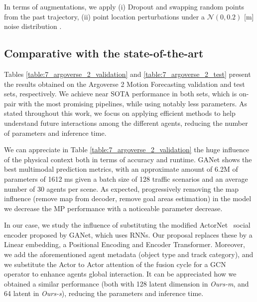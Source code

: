 In terms of augmentations, we apply (i) Dropout and swapping random points from the past trajectory, (ii) point location perturbations under a $\mathcal{N}(0, 0.2)$ [m] noise distribution \cite{ye2021tpcn}.

\subsection{Comparative with the state-of-the-art}
\label{subsec:7_experimental_results_comparative_sota}


Tables \ref{table:7_argoverse_2_validation} and \ref{table:7_argoverse_2_test} present the results obtained on the Argoverse 2 Motion Forecasting validation and test sets, respectively. We achieve near \ac{SOTA} performance in both sets, which is on-pair with the most promising pipelines, while using notably less parameters. As stated throughout this work, we focus on applying efficient methods to help understand future interactions among the different agents, reducing the number of parameters and inference time. 

We can appreciate in Table \ref{table:7_argoverse_2_validation} the huge influence of the physical context both in terms of accuracy and runtime. GANet \cite{wang2022ganet} shows the best multimodal prediction metrics, with an approximate amount of 6.2M of parameters of 1612 ms given a batch size of 128 traffic scenarios and an average number of 30 agents per scene. As expected, progressively removing the map influence (remove map from decoder, remove goal areas estimation) in the model we decrease the MP performance with a noticeable parameter decrease. 


In our case, we study the influence of substituting the modified ActorNet~\cite{wang2022ganet, liang2020learning} social encoder proposed by GANet, which uses RNNs. Our proposal replaces these by a Linear embedding, a Positional Encoding and Encoder Transformer. Moreover, we add the aforementioned agent metadata (object type and track category), and we substitute the Actor to Actor attention of the fusion cycle for a GCN~\cite{schmidt2022crat} operator to enhance agents global interaction. 
%
It can be appreciated how we obtained a similar performance (both with 128 latent dimension in \textit{Ours-m}, and 64 latent in \textit{Ours-s}), reducing the parameters and inference time. 

